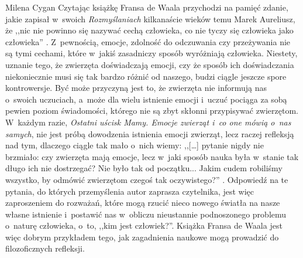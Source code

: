 \begin{newrevplenv}{Milena Cygan}
Czytając książkę Fransa de Waala przychodzi na pamięć zdanie, jakie zapisał w~swoich \textit{Rozmyślaniach} kilkanaście wieków temu Marek Aureliusz, że ,,nic nie powinno się nazywać cechą człowieka, co nie tyczy się człowieka jako człowieka''
\parencite[][s.~44]{marek_aureliusz_rozmyslania_2003}. %
 Z~pewnością, emocje, zdolność do odczuwania czy przeżywania nie są tymi cechami, które w~jakiś zasadniczy sposób wyróżniają człowieka. Niestety, uznanie tego, że zwierzęta doświadczają emocji, czy że sposób ich doświadczania niekoniecznie musi się tak bardzo różnić od naszego, budzi ciągle jeszcze spore kontrowersje. Być może przyczyną jest to, że zwierzęta nie informują nas o~swoich uczuciach, a~może dla wielu istnienie emocji i~uczuć pociąga za sobą pewien poziom świadomości, którego nie są zbyt skłonni przypisywać zwierzętom. W~każdym razie, \textit{Ostatni uścisk Mamy. Emocje zwierząt i~co one mówią o~nas samych}, nie jest próbą dowodzenia istnienia emocji zwierząt, lecz raczej refleksją nad tym, dlaczego ciągle tak mało o~nich wiemy: ,,[…] pytanie nigdy nie brzmiało: czy zwierzęta mają emocje, lecz w~jaki sposób nauka była w~stanie tak długo ich nie dostrzegać? Nie było tak od początku... Jakim cudem robiliśmy wszystko, by odmówić zwierzętom czegoś tak oczywistego?'' 
\parencite[][s.~335]{waal_ostatni_2019}. %
 Odpowiedź na te pytania, do których przemyślenia autor zaprasza czytelnika, jest więc zaproszeniem do rozważań, które mogą rzucić nieco nowego światła na nasze własne istnienie i~postawić nas w~obliczu nieustannie podnoszonego problemu o~naturę człowieka, o~to, ,,kim jest człowiek?''. Książka Fransa de Waala jest więc dobrym przykładem tego, jak zagadnienia naukowe mogą prowadzić do filozoficznych refleksji.




\pagebreak


\vspace{5mm}%
\begin{flushright}
{\chaptitleeng\color{black!50}{Non-human emotions}\nopagebreak[4]}
\end{flushright}


\end{newrevplenv}
